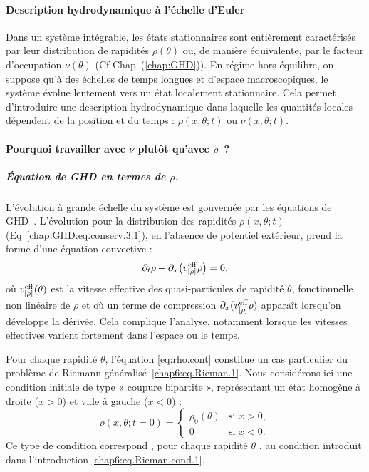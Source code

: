 \paragraph{Description hydrodynamique à l’échelle d’Euler}

Dans un système intégrable, les états stationnaires sont entièrement caractérisés par leur distribution de rapidités $\rho(\theta)$ ou, de manière équivalente, par le facteur d’occupation $\nu(\theta)$ (Cf {Chap~(\ref{chap:GHD})}). En régime hors équilibre, on suppose qu’à des échelles de temps longues et d’espace macroscopiques, le système évolue lentement vers un état localement stationnaire. Cela permet d’introduire une description hydrodynamique dans laquelle les quantités locales dépendent de la position et du temps : $\rho(x,\theta;t)$ ou $\nu(x,\theta;t)$.


\paragraph{Pourquoi travailler avec $\nu$ plutôt qu’avec $\rho$~?}
\subparagraph{Équation de GHD en termes de $\rho$.}
L’évolution à grande échelle du système est gouvernée par les équations de GHD~\cite{bertini_transport_2016, castro-alvaredo_emergent_2016}. 
L'évolution pour la distribution des rapidités $\rho(x,\theta;t)$ (Eq~\eqref{chap:GHD:eq.conserv.3.1}), en l'absence de potentiel extérieur, prend la forme d’une équation convective :
\begin{equation}
	\label{eq:rho.cont}
	\partial_t \rho + \partial_x \big( v^{\rm eff}_{[\rho]} \rho \big) = 0,
\end{equation}
où $v^{\rm eff}_{[\rho]}(\theta)$ est la vitesse effective des quasi-particules de rapidité $\theta$, fonctionnelle non linéaire de $\rho$ et où un terme de compression $\partial_x (v^{\rm eff}_{[\rho]} \rho)$ apparaît lorsqu’on développe la dérivée. Cela complique l’analyse, notamment lorsque les vitesses effectives varient fortement dans l’espace ou le temps.

Pour chaque rapidité $\theta$, l'équation \eqref{eq:rho.cont} constitue un cas particulier du problème de Riemann généralisé~\eqref{chap6:eq.Rieman.1}.
Nous considérons ici une condition initiale de type « coupure bipartite », représentant un état homogène à droite ($x>0$) et vide à gauche ($x<0$) :
\begin{equation}
    \label{eq:rho.cont.init}
    \rho(x,\theta;t=0) = 
    \begin{cases}
        \rho_0(\theta) & \text{si } x > 0, \\
        0 & \text{si } x < 0.
    \end{cases}
\end{equation}
Ce type de condition correspond , pour chaque rapidité $\theta$ , au condition introduit dans l'introduction \eqref{chap6:eq.Rieman.cond.1}.\\

